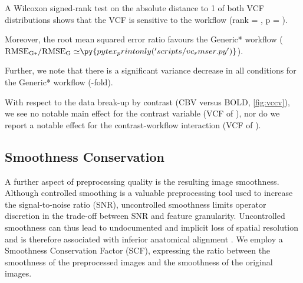 A Wilcoxon signed-rank test on the absolute distance to 1 of both VCF distributions shows that the VCF is sensitive to the workflow (rank = , p = ).

%
Moreover, the root mean squared error ratio favours the Generic* workflow
($\mathrm{RMSE_{G*}/RMSE_{G}\simeq} \py{pytex_printonly('scripts/vc_rmser.py')}$).

Further, we note that there is a significant variance decrease in all conditions for the Generic* workflow
(-fold).

With respect to the data break-up by contrast (CBV versus BOLD, \cref{fig:vccv}), we see no notable main effect for the contrast variable
(VCF of ), nor do we report a notable effect for the contrast-workflow interaction (VCF of ).

\subsection{Smoothness Conservation}

A further aspect of preprocessing quality is the resulting image smoothness.
Although controlled smoothing is a valuable preprocessing tool used to increase the signal-to-noise ratio (SNR), uncontrolled smoothness limits operator discretion in the trade-off between SNR and feature granularity.
Uncontrolled smoothness can thus lead to undocumented and implicit loss of spatial resolution and is therefore associated with inferior anatomical alignment \cite{fmriprep}.
We employ a Smoothness Conservation Factor (SCF), expressing the ratio between the smoothness of the preprocessed images and the smoothness of the original images.

